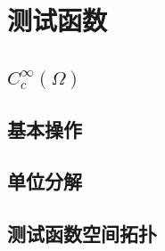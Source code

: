 \section{测试函数}
\label{b1:sec:2001}


\subsection{\texorpdfstring{\(C_c^\infty(\Omega)\)}{Cc∞()}}
\label{b1:subsec:200101}

\subsection{基本操作}
\label{b1:subsec:200102}

\subsection{单位分解}
\label{b1:subsec:200103}

\subsection{测试函数空间拓扑}
\label{b1:subsec:200104}



